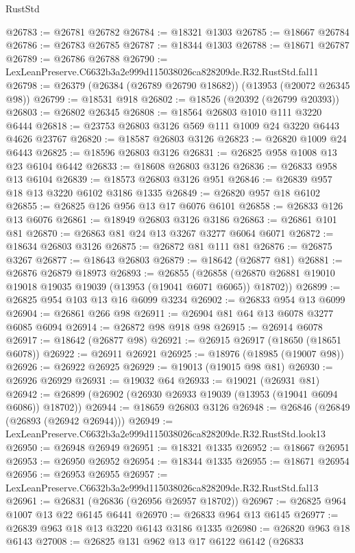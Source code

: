 \begin{lexlean}{RustStd}
\begin{coremodule}
@26783 := @26781 @26782
@26784 := @18321 @1303
@26785 := @18667 @26784
@26786 := @26783 @26785
@26787 := @18344 @1303
@26788 := @18671 @26787
@26789 := @26786 @26788
@26790 := LexLeanPreserve.C6632b3a2e999d115038026ca828209de.R32.RustStd.fal11
@26798 := @26379 (@26384 (@26789 @26790 @18682)) (@13953 (@20072 @26345 @98))
@26799 := @18531 @918
@26802 := @18526 (@20392 (@26799 @20393))
@26803 := @26802 @26345
@26808 := @18564 @26803 @1010 @111 @3220 @6444
@26818 := @23753 @26803 @3126 @569 @111 @1009 @24 @3220 @6443 @4626 @23767
@26820 := @18587 @26803 @3126
@26823 := @26820 @1009 @24 @6443
@26825 := @18596 @26803 @3126
@26831 := @26825 @958 @1008 @13 @23 @6104 @6442
@26833 := @18608 @26803 @3126
@26836 := @26833 @958 @13 @6104
@26839 := @18573 @26803 @3126 @951
@26846 := @26839 @957 @18 @13 @3220 @6102 @3186 @1335
@26849 := @26820 @957 @18 @6102
@26855 := @26825 @126 @956 @13 @17 @6076 @6101
@26858 := @26833 @126 @13 @6076
@26861 := @18949 @26803 @3126 @3186
@26863 := @26861 @101 @81
@26870 := @26863 @81 @24 @13 @3267 @3277 @6064 @6071
@26872 := @18634 @26803 @3126
@26875 := @26872 @81 @111 @81
@26876 := @26875 @3267
@26877 := @18643 @26803
@26879 := @18642 (@26877 @81)
@26881 := @26876 @26879 @18973
@26893 := @26855
    (@26858 (@26870 @26881 @19010 @19018 @19035 @19039 (@13953 (@19041 @6071 @6065)) @18702))
@26899 := @26825 @954 @103 @13 @16 @6099 @3234
@26902 := @26833 @954 @13 @6099
@26904 := @26861 @266 @98
@26911 := @26904 @81 @64 @13 @6078 @3277 @6085 @6094
@26914 := @26872 @98 @918 @98
@26915 := @26914 @6078
@26917 := @18642 (@26877 @98)
@26921 := @26915 @26917 (@18650 (@18651 @6078))
@26922 := @26911 @26921
@26925 := @18976 (@18985 (@19007 @98))
@26926 := @26922 @26925
@26929 := @19013 (@19015 @98 @81)
@26930 := @26926 @26929
@26931 := @19032 @64
@26933 := @19021 (@26931 @81)
@26942 := @26899 (@26902 (@26930 @26933 @19039 (@13953 (@19041 @6094 @6086)) @18702))
@26944 := @18659 @26803 @3126
@26948 := @26846 (@26849 (@26893 (@26942 @26944)))
@26949 := LexLeanPreserve.C6632b3a2e999d115038026ca828209de.R32.RustStd.look13
@26950 := @26948 @26949
@26951 := @18321 @1335
@26952 := @18667 @26951
@26953 := @26950 @26952
@26954 := @18344 @1335
@26955 := @18671 @26954
@26956 := @26953 @26955
@26957 := LexLeanPreserve.C6632b3a2e999d115038026ca828209de.R32.RustStd.fal13
@26961 := @26831 (@26836 (@26956 @26957 @18702))
@26967 := @26825 @964 @1007 @13 @22 @6145 @6441
@26970 := @26833 @964 @13 @6145
@26977 := @26839 @963 @18 @13 @3220 @6143 @3186 @1335
@26980 := @26820 @963 @18 @6143
@27008 := @26825
    @131
    @962
    @13
    @17
    @6122
    @6142
    (@26833

\end{coremodule}
\end{lexlean}

